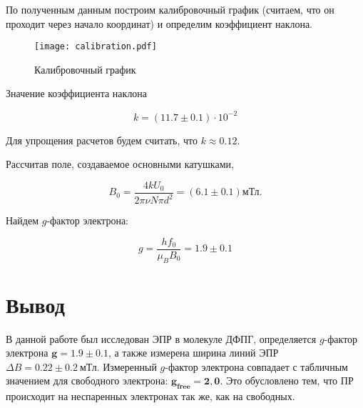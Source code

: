     По полученным данным построим калибровочный график (считаем, что он проходит через начало координат)
    и определим коэффициент наклона.

    \begin{figure}
        \centering
        \texttt{[image: calibration.pdf]}
        \caption{Калибровочный график}
        \label{fig:calibration}
    \end{figure}

    Значение коэффициента наклона 

    \[ k = (11.7 \pm 0.1) \cdot 10^{-2} \]

    Для упрощения расчетов будем считать, что $k \approx 0.12$.


    Рассчитав поле, создаваемое основными катушками,
    
    \begin{equation*}
        B_0 = \frac{4 k U_0}{2\pi\nu N \pi d^2} = (6.1 \pm 0.1) \text{мТл}.
    \end{equation*}
    
    Найдем $g$-фактор электрона:
    
    \begin{equation*}
        g = \frac{hf_0}{\mu_BB_0} = 1.9 \pm 0.1
    \end{equation*}
    

    \section*{Вывод}
	
    В данной работе был исследован ЭПР в молекуле ДФПГ, определяется $g$-фактор электрона $\pmb{g = 1.9 \pm 0.1}$, а также измерена ширина линий ЭПР $\Delta B = 0.22 \pm 0.2~\text{мТл}$. 
	Измеренный $g$-фактор электрона совпадает с табличным значением для свободного электрона: $\pmb{g_{free} = 2,0}$. Это обусловлено тем, что ПР происходит на неспаренных электронах так же, как на свободных.
	


